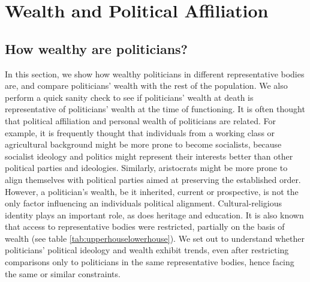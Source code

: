 
\section{Wealth and Political Affiliation}

\subsection{How wealthy are politicians?}

    In this section, we show how wealthy politicians in different representative bodies are, and compare politicians' wealth with the rest of the population. We also perform a quick sanity check to see if politicians' wealth at death is representative of politicians' wealth at the time of functioning. It is often thought that political affiliation and personal wealth of politicians are related. For example, it is frequently thought that individuals from a working class or agricultural background might be more prone to become socialists, because socialist ideology and politics might represent their interests better than other political parties and ideologies. Similarly, aristocrats might be more prone to align themselves with political parties aimed at preserving the established order. However, a politician's wealth, be it inherited, current or prospective, is not the only factor influencing an individuals political alignment. Cultural-religious identity plays an important role, as does heritage and education. It is also known that access to representative bodies were restricted, partially on the basis of wealth (see table \ref{tab:upperhouselowerhouse}). We set out to understand whether politicians' political ideology and wealth exhibit trends, even after restricting comparisons only to politicians in the same representative bodies, hence facing the same or similar constraints. 

